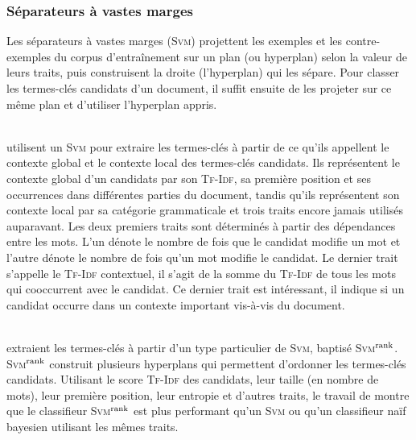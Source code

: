       \subsubsection{Séparateurs à vastes marges}
      \label{subsubsec:main-state_of_the_art-automatic_keyphrase_extraction-supervised_keyphrase_extraction-svms}
        Les séparateurs à vastes marges (\textsc{Svm}) projettent les exemples
        et les contre-exemples du corpus d'entraînement sur un plan (ou
        hyperplan) selon la
        valeur de leurs traits, puis cons\-truisent la droite (l'hyperplan) qui les sépare.
        Pour classer les termes-clés candidats d'un document, il suffit ensuite
        de les projeter sur ce même plan et d'utiliser l'hyperplan appris.

        ~\\ utilisent un \textsc{Svm} pour extraire les
        termes-clés à partir de ce qu'ils appellent le contexte global et le
        contexte local des termes-clés candidats. Ils représentent le contexte
        global d'un candidats par son \textsc{Tf-Idf}, sa première position et
        ses occurrences dans différentes parties du document, tandis qu'ils
        représentent son contexte local par sa catégorie grammaticale et trois
        traits encore jamais utilisés auparavant. Les deux premiers traits sont
        déterminés à partir des dépendances entre les mots.
        L'un dénote le nombre de fois que le candidat modifie un mot
        et l'autre dénote le nombre de fois qu'un mot modifie le candidat. Le
        dernier trait s'appelle le \textsc{Tf-Idf} contextuel, il s'agit de la
        somme du \textsc{Tf-Idf} de tous les mots qui cooccurrent avec le
        candidat. Ce dernier trait est intéressant, il indique si un candidat occurre dans un
        contexte important vis-à-vis du document.

        ~\\ extraient les termes-clés à partir d'un
        type particulier de \textsc{Svm}, baptisé
        \textsc{Svm}$^\textnormal{rank}$. \textsc{Svm}$^\textnormal{rank}$
        construit plusieurs hyperplans qui permettent d'ordonner les termes-clés
        candidats. Utilisant le score \textsc{Tf-Idf} des candidats, leur taille
        (en nombre de mots), leur première position, leur entropie et d'autres
        traits, le travail de  montre que le
        classifieur \textsc{Svm}$^\textnormal{rank}$ est plus performant qu'un
        \textsc{Svm} ou qu'un classifieur naïf bayesien utilisant les mêmes
        traits.

